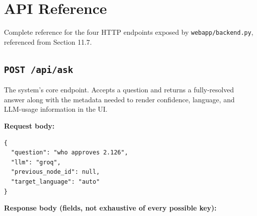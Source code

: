 \chapter{API Reference}
\label{ch:api-reference}
Complete reference for the four HTTP endpoints exposed by \texttt{webapp/\allowbreak{}backend.py}, referenced from Section 11.7.

\section{\texttt{POST /\allowbreak{}api/\allowbreak{}ask}}
The system's core endpoint. Accepts a question and returns a fully-resolved answer along with the metadata needed to render confidence, language, and LLM-usage information in the UI.

\textbf{Request body:}

\begin{lstlisting}[caption={example request}]
{
  "question": "who approves 2.126",
  "llm": "groq",
  "previous_node_id": null,
  "target_language": "auto"
}
\end{lstlisting}
\textbf{Response body (fields, not exhaustive of every possible key):}

